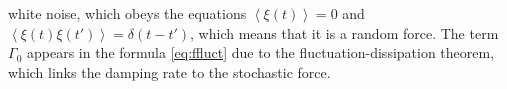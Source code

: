\documentclass[12pt]{article}
\begin{document}
white noise, which obeys the equations $\left\langle\xi(t)\right\rangle= 0$ and $\left\langle\xi(t)\xi(t')\right\rangle= \delta(t-t')$, which means
that it is a random force. The term $\Gamma_0$ appears in the formula \eqref{eq:ffluct} 
due to the fluctuation-dissipation theorem, which links the damping rate to the stochastic force.\\
\end{document}
